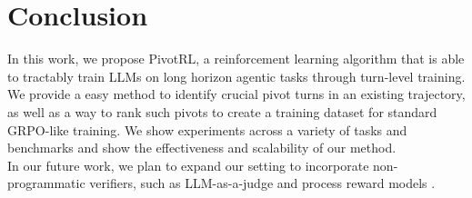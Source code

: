 \documentclass{article}
\theoremstyle{plain}
\theoremstyle{definition}
\begin{document}

\printAffiliationsAndNotice{}  











% 

% 

\section{Conclusion}
\label{sec:conclusion}
In this work, we propose PivotRL, a reinforcement learning algorithm that is able to tractably train LLMs on long horizon agentic tasks through turn-level training. We provide a easy method to identify crucial pivot turns in an existing trajectory, as well as a way to rank such pivots to create a training dataset for standard GRPO-like training. We show experiments across a variety of tasks and benchmarks and show the effectiveness and scalability of our method. \\
In our future work, we plan to expand our setting to incorporate non-programmatic verifiers, such as LLM-as-a-judge \citep{zheng2023judgingllmasajudgemtbenchchatbot} and process reward models \citep{lightman2023letsverifystepstep}.




\newpage
\appendix
\onecolumn
\end{document}

